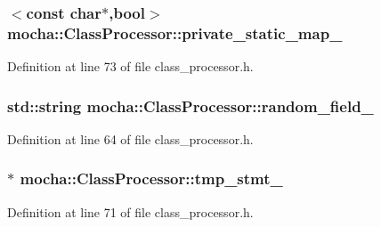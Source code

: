 \hypertarget{classmocha_1_1_class_processor_a13be0d8b8aa75a5058b8521925a9d74b}{
\subsubsection[{private\_\-static\_\-map\_\-}]{$<$const char$\ast$,bool$>$ {\bf mocha::ClassProcessor::private\_\-static\_\-map\_\-}}}
\label{classmocha_1_1_class_processor_a13be0d8b8aa75a5058b8521925a9d74b}


Definition at line 73 of file class\_\-processor.h.

\hypertarget{classmocha_1_1_class_processor_abb72577e164ec690e69e29d555aab92d}{
\subsubsection[{random\_\-field\_\-}]{\setlength{\rightskip}{0pt plus 5cm}std::string {\bf mocha::ClassProcessor::random\_\-field\_\-}}}
\label{classmocha_1_1_class_processor_abb72577e164ec690e69e29d555aab92d}


Definition at line 64 of file class\_\-processor.h.

\hypertarget{classmocha_1_1_class_processor_a5b61b8872052d21ab40c071951871f99}{
\subsubsection[{tmp\_\-stmt\_\-}]{$\ast$ {\bf mocha::ClassProcessor::tmp\_\-stmt\_\-}}}
\label{classmocha_1_1_class_processor_a5b61b8872052d21ab40c071951871f99}


Definition at line 71 of file class\_\-processor.h.

